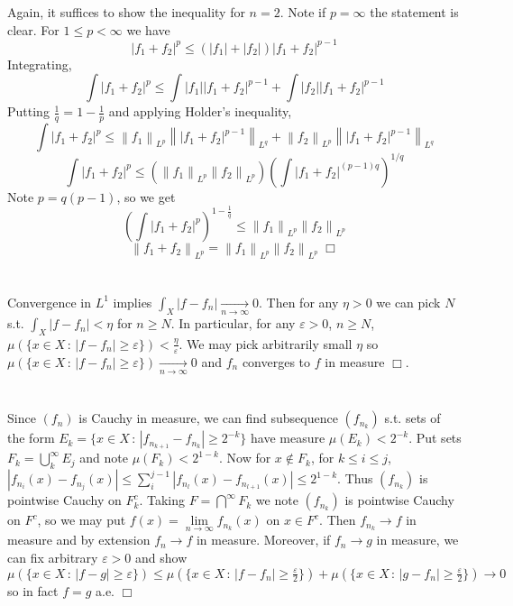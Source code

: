 \documentclass{article}
\newcommand{\norm}[1]{\left\lVert#1\right\rVert}
\begin{document}
\section{}
Again, it suffices to show the inequality for $n = 2$. Note if $p = \infty$ the statement is clear. For $1 \leq p < \infty$ we have
$$|f_1 + f_2|^p \leq \left(|f_1| + |f_2|\right) |f_1+f_2|^{p-1}$$
Integrating,
$$\int |f_1+f_2|^p \leq \int |f_1||f_1+f_2|^{p-1} + \int |f_2||f_1+f_2|^{p-1}$$
Putting $\frac{1}{q} = 1 - \frac{1}{p}$ and applying Holder's inequality,
$$\int |f_1+f_2|^p \leq \norm{f_1}_{L^{p}}\norm{|f_1+f_2|^{p-1}}_{L^{q}} + \norm{f_2}_{L^{p}}\norm{|f_1+f_2|^{p-1}}_{L^{q}}$$
$$\int |f_1+f_2|^p \leq \left( \norm{f_1}_{L^{p}}\norm{f_2}_{L^{p}} \right)\left( \int |f_1+f_2|^{(p-1)q} \right)^{1/q}$$
Note $p = q(p-1)$, so we get
$$\left(\int |f_1+f_2|^p \right)^{1 - \frac{1}{q}} \leq \norm{f_1}_{L^{p}}\norm{f_2}_{L^{p}}$$
$$\norm{f_1 + f_2}_{L^{p}} = \norm{f_1}_{L^{p}}\norm{f_2}_{L^{p}} \; \Box$$

\section{}
Convergence in $L^1$ implies $\int_X |f - f_n| \xrightarrow[n\rightarrow\infty]{} 0$. Then for any $\eta > 0$ we can pick $N$ s.t. $\int_X |f-f_n| < \eta$ for $n\geq N$. In particular, for any $\varepsilon > 0$, $n\geq N$, $\mu(\{ x \in X \,:\, |f-f_n| \geq \varepsilon \}) < \frac{\eta}{\varepsilon}$. We may pick arbitrarily small $\eta$ so $\mu(\{ x \in X \,:\, |f-f_n| \geq \varepsilon \}) \xrightarrow[n\rightarrow\infty]{} 0$ and $f_n$ converges to $f$ in measure $\Box$.

\section{}
Since $(f_n)$ is Cauchy in measure, we can find subsequence $(f_{n_k})$ s.t. sets of the form $E_k = \{ x\in X \,:\, |f_{n_{k+1}} - f_{n_k}| \geq 2^{-k}\}$ have measure $\mu(E_k) < 2^{-k}$. Put sets $F_k = \bigcup\limits_k^\infty E_j$ and note $\mu(F_k) < 2^{1-k}$. Now for $x \notin F_k$, for $k \leq i \leq j$, $|f_{n_i}(x)-f_{n_j}(x)| \leq \sum\limits_i^{j-1} |f_{n_l}(x)-f_{n_{l+1}}(x)| \leq 2^{1-k}$. Thus $(f_{n_k})$ is pointwise Cauchy on $F_k^c$. Taking $F = \bigcap\limits^\infty F_k$ we note $(f_{n_k})$ is pointwise Cauchy on $F^c$, so we may put $f(x) = \lim\limits_{n\rightarrow\infty} f_{n_k}(x)$ on $x \in F^c$. Then $f_{n_k} \rightarrow f$ in measure and by extension $f_n \rightarrow f$ in measure. Moreover, if $f_n \rightarrow g$ in measure, we can fix arbitrary $\varepsilon > 0$ and show $\mu(\{ x \in X \,:\, |f-g| \geq \varepsilon \}) \leq \mu(\{ x \in X \,:\, |f-f_n| \geq \frac{\varepsilon}{2} \}) + \mu(\{ x \in X \,:\, |g-f_n| \geq \frac{\varepsilon}{2} \}) \rightarrow 0$ so in fact $f = g$ a.e. $\Box$
\end{document}
